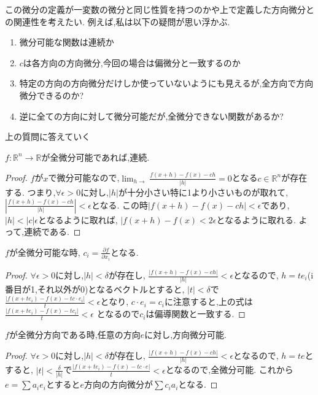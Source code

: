 この微分の定義が一変数の微分と同じ性質を持つのかや上で定義した方向微分との関連性を考えたい.
例えば,私は以下の疑問が思い浮かぶ.

\begin{enumerate}
  \item 微分可能な関数は連続か
  \item $c$は各方向の方向微分,今回の場合は偏微分と一致するのか
  \item 特定の方向の方向微分だけしか使っていないようにも見えるが,全方向で方向微分できるのか?
  \item 逆に全ての方向に対して微分可能だが,全微分できない関数があるか?
\end{enumerate}
上の質問に答えていく

\begin{lem}
$f: \mathbb{R}^n \to \mathbb{R}$が全微分可能であれば,連続.
\end{lem}
\begin{proof}
$f$が$x$で微分可能なので,$\lim_{h \to }\frac{f(x+h) - f(x) - ch}{|h|}  = 0$となる$c \in \mathbb{R}^n$が存在する.
つまり,$\forall \epsilon > 0$に対し,$|h|$が十分小さい特に1より小さいものが取れて,
$|\frac{f(x+h) - f(x) - ch}{|h|}| < \epsilon$となる.
この時$|f(x+h) - f(x) - ch| < \epsilon$であり,$|h| < |c|\epsilon$となるように取れば,
$|f(x+h) - f(x) < 2\epsilon$となるように取れる.
よって,連続である.
\end{proof}


\begin{prop}
  $f$が全微分可能な時,
  $c_i = \frac{\partial f}{\partial x_i}$となる.
\end{prop}
\begin{proof}
$\forall \epsilon >0$に対し,$|h| < \delta$が存在し,
$\frac{|f(x+h)-f(x) - ch|}{|h|} < \epsilon$となるので,
$h = te_i$(i番目が1,それ以外が0)となるベクトルとすると,
$|t| < \delta$で$\frac{|f(x+te_i)-f(x) - tc\cdot e_i|}{t} < \epsilon$となり,
$c \cdot e_i = c_i$に注意すると,上の式は$\frac{|f(x+te_i)-f(x) - tc_i|}{t} < \epsilon$
となるので$c_i$は偏導関数と一致する.
\end{proof}


\begin{prop}
  $f$が全微分方向である時,任意の方向$e$に対し,方向微分可能.
\end{prop}
\begin{proof}
$\forall \epsilon >0$に対し,$|h| < \delta$が存在し,
$\frac{|f(x+h)-f(x) - ch|}{|h|} < \epsilon$となるので,
$h = te$とすると,
$|t| < \frac{\delta}{|h|}$で$\frac{|f(x+te_i)-f(x) - tc \cdot e|}{t} < \epsilon$となるので,全微分可能.
これから$e = \sum a_i e_i$とすると$e$方向の方向微分が$\sum c_i a_i$となる.
\end{proof}


